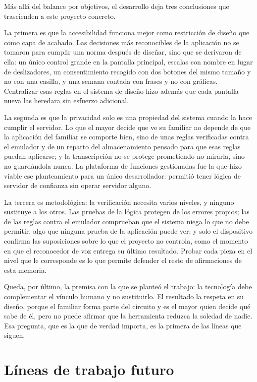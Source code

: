 Más allá del balance por objetivos, el desarrollo deja tres conclusiones que trascienden a este proyecto concreto.

La primera es que la accesibilidad funciona mejor como restricción de diseño que como capa de acabado. Las decisiones más reconocibles de la aplicación no se tomaron para cumplir una norma después de diseñar, sino que se derivaron de ella: un único control grande en la pantalla principal, escalas con nombre en lugar de deslizadores, un consentimiento recogido con dos botones del mismo tamaño y no con una casilla, y una semana contada con frases y no con gráficas. Centralizar esas reglas en el sistema de diseño hizo además que cada pantalla nueva las heredara sin esfuerzo adicional.

La segunda es que la privacidad solo es una propiedad del sistema cuando la hace cumplir el servidor. Lo que el mayor decide que ve su familiar no depende de que la aplicación del familiar se comporte bien, sino de unas reglas verificadas contra el emulador y de un reparto del almacenamiento pensado para que esas reglas puedan aplicarse; y la transcripción no se protege prometiendo no mirarla, sino no guardándola nunca. La plataforma de funciones gestionadas fue la que hizo viable ese planteamiento para un único desarrollador: permitió tener lógica de servidor de confianza sin operar servidor alguno.

La tercera es metodológica: la verificación necesita varios niveles, y ninguno sustituye a los otros. Las pruebas de la lógica protegen de los errores propios; las de las reglas contra el emulador comprueban que el sistema niega lo que no debe permitir, algo que ninguna prueba de la aplicación puede ver; y solo el dispositivo confirma las suposiciones sobre lo que el proyecto no controla, como el momento en que el reconocedor de voz entrega su último resultado. Probar cada pieza en el nivel que le corresponde es lo que permite defender el resto de afirmaciones de esta memoria.

Queda, por último, la premisa con la que se planteó el trabajo: la tecnología debe complementar el vínculo humano y no sustituirlo. El resultado la respeta en su diseño, porque el familiar forma parte del circuito y es el mayor quien decide qué sabe de él, pero no puede afirmar que la herramienta reduzca la soledad de nadie. Esa pregunta, que es la que de verdad importa, es la primera de las líneas que siguen.

\section{Líneas de trabajo futuro}
\label{sec:lineas-futuras}

